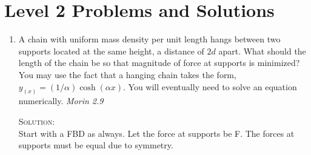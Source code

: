 \section{Level 2 Problems and Solutions}

\begin{enumerate}

\item A chain with uniform mass density per unit length hangs between two supports located at the same height, a distance of $2d$ apart. What should the length of the chain be so that magnitude of force at supports is minimized? You may use the fact that a hanging chain takes the form, $y_{(x)}=(1/\alpha)\cosh(\alpha x)$. You will eventually need to solve an equation numerically. \hfill \textsl{Morin 2.9}
\begin{figure}[hbt]
    \centering
    
\end{figure}

\textsc{Solution:}\\
Start with a FBD as always. Let the force at supports be F. The forces at supports must be equal due to symmetry.
\begin{figure}[hbt]
    \centering
    
\end{figure}


\end{enumerate}
